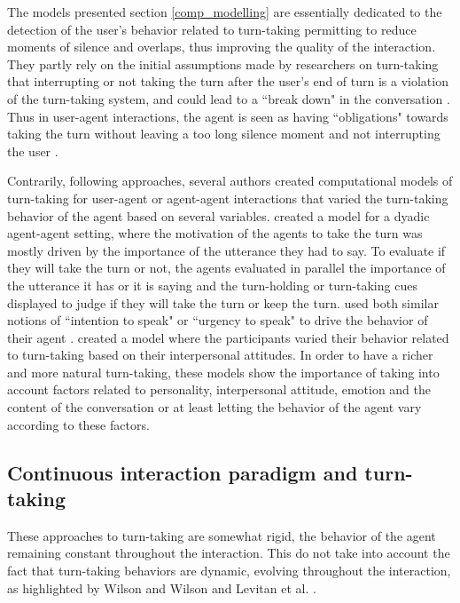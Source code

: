 The models presented section \ref{comp_modelling} are essentially dedicated to the detection of the user's behavior related to turn-taking permitting
to reduce moments of silence and overlaps, thus improving the quality of the interaction. They partly rely on the initial assumptions made by researchers on
turn-taking that interrupting or not taking
the turn after the user's end of turn is a violation
of the turn-taking system, and could lead to a ``break
down" in the conversation \citep{cutler_analysis_1986}. Thus in user-agent interactions,
the agent is seen as having ``obligations" towards
taking the turn without leaving a too long silence
moment and not interrupting the user \citep{de_kok_multimodal_2009}.

Contrarily, following \citep{oconnell_turn-taking_1990,clark_using_1996} approaches,  several authors created computational models of
turn-taking for user-agent or agent-agent interactions
that varied the turn-taking behavior of the agent based
on several variables. \citep{selfridge_bidding_2009} created a model for a dyadic
agent-agent setting, where the motivation of the agents
to take the turn was mostly driven by the importance
of the utterance they had to say. To evaluate if they
will take the turn or not, the agents evaluated in parallel
the importance of the utterance it has or it is saying
and the turn-holding or turn-taking cues displayed to
judge if they will take the turn or keep the turn. \citep{lessmann_towards_2004,thorisson_multiparty_2010}
used both similar notions of ``intention to speak" \citep{lessmann_towards_2004} or
``urgency to speak" to drive the behavior of their agent
\citep{thorisson_multiparty_2010}. \citep{ravenet_conversational_2015} created a model where the participants varied
their behavior related to turn-taking based on their interpersonal
attitudes. In order to have a richer and more
natural turn-taking, these models show the importance
of taking into account factors related to personality,
interpersonal attitude, emotion and the content of the
conversation or at least letting the behavior of the agent
vary according to these factors.

\subsection{Continuous interaction paradigm and turn-taking}

These approaches to turn-taking are somewhat rigid, the behavior of the agent remaining constant throughout the interaction. This do not take into account the fact that turn-taking behaviors are dynamic, evolving throughout the interaction, as highlighted by Wilson and Wilson \citep{wilson_oscillator_2005} and Levitan et al. 
 \citep{levitan_entrainment_2015}.  
  
